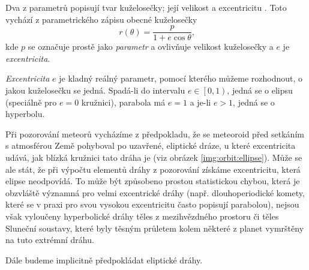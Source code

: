 \medskip

Dva z parametrů popisují tvar kuželosečky; její velikost a excentricitu \cite{astro}. Toto vychází z parametrického zápisu obecné kuželosečky
\begin{equation}
    r(\theta)=\frac{p}{1+e \cos{\theta}}\text{,}
    \label{eqn:orbit:parametric}
\end{equation}
kde $p$ se označuje prostě jako \textit{parametr} a ovlivňuje velikost kuželosečky a $e$ je \textit{excentricita}.

\textit{Excentricita} $e$ je kladný reálný parametr, pomocí kterého můžeme rozhodnout, o jakou kuželosečku se jedná. Spadá-li do intervalu $e\in\left[0,1\right)$, jedná se o elipsu (speciálně pro $e=0$ kružnici), parabola má $e=1$ a je-li $e>1$, jedná se o hyperbolu.

\smallskip

Při pozorování meteorů vycházíme z předpokladu, že se meteoroid před setkáním s atmosférou Země pohyboval po uzavřené, eliptické dráze, u které excentricita udává, jak blízká kružnici tato dráha je (viz obrázek \ref{img:orbit:ellipse}). Může se ale stát, že při výpočtu elementů dráhy z pozorování získáme excentricitu, která elipse neodpovídá. To může být způsobeno prostou statistickou chybou, která je obzvláště významná pro velmi excentrické dráhy (např. dlouhoperiodické komety, které se v praxi pro svou vysokou excentricitu často popisují parabolou), nejsou však vyloučeny hyperbolické dráhy těles z mezihvězdného prostoru či těles Sluneční soustavy, které byly těsným průletem kolem některé z planet vymrštěny na tuto extrémní dráhu.

Dále budeme implicitně předpokládat eliptické dráhy.

